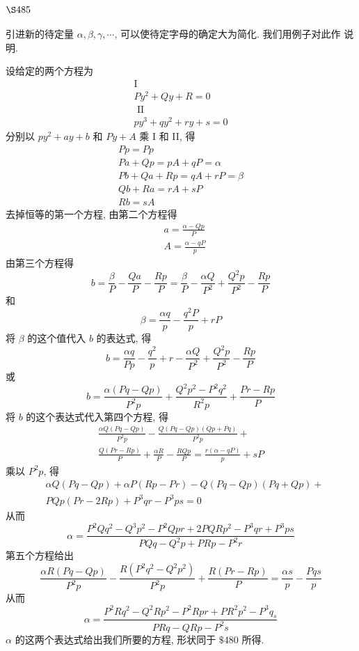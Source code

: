 \section{$\S 485$}

引进新的待定量 $\alpha, \beta, \gamma, \cdots$, 可以使待定字母的确定大为简化. 我们用例子对此作 说明.

设给定的两个方程为
\[
\begin{gathered}
\mathrm{I} \\
P y^{2}+Q y+R=0 \\
\text { II } \\
p y^{3}+q y^{2}+r y+s=0
\end{gathered}
\]
分别以 $p y^{2}+a y+b$ 和 $P y+A$ 乘 I 和 II, 得
\[
\begin{gathered}
P p=P p \\
P a+Q p=p A+q P=\alpha \\
P b+Q a+R p=q A+r P=\beta \\
Q b+R a=r A+s P \\
R b=s A
\end{gathered}
\]
去掉恒等的第一个方程, 由第二个方程得
\[
\begin{aligned}
& a=\frac{\alpha-Q p}{P} \\
& A=\frac{\alpha-q P}{p}
\end{aligned}
\]
由第三个方程得
\[
b=\frac{\beta}{P}-\frac{Q a}{P}-\frac{R p}{P}=\frac{\beta}{P}-\frac{\alpha Q}{P^{2}}+\frac{Q^{2} p}{P^{2}}-\frac{R p}{P}
\]
和
\[
\beta=\frac{\alpha q}{p}-\frac{q^{2} P}{p}+r P
\]
将 $\beta$ 的这个值代入 $b$ 的表达式, 得
\[
b=\frac{\alpha q}{P p}-\frac{q^{2}}{p}+r-\frac{\alpha Q}{P^{2}}+\frac{Q^{2} p}{P^{2}}-\frac{R p}{P}
\]
或
\[
b=\frac{\alpha(P q-Q p)}{P^{2} p}+\frac{Q^{2} p^{2}-P^{2} q^{2}}{R^{2} p}+\frac{P r-R p}{P}
\]
将 $b$ 的这个表达式代入第四个方程, 得
\[
\begin{gathered}
\frac{\alpha Q(P q-Q p)}{P^{2} p}-\frac{Q(P q-Q p)(Q p+P q)}{P^{2} p}+ \\
\frac{Q(P r-R p)}{P}+\frac{\alpha R}{P}-\frac{R Q p}{P}=\frac{r(\alpha-q P)}{p}+s P
\end{gathered}
\]
乘以 $P^{2} p$, 得
\[
\begin{aligned}
& \alpha Q(P q-Q p)+\alpha P(R p-P r)-Q(P q-Q p)(P q+Q p)+ \\
& P Q p(P r-2 R p)+P^{3} q r-P^{3} p s=0
\end{aligned}
\]
从而
\[
\alpha=\frac{P^{2} Q q^{2}-Q^{3} p^{2}-P^{2} Q p r+2 P Q R p^{2}-P^{3} q r+P^{3} p s}{P Q q-Q^{2} p+P R p-P^{2} r}
\]
第五个方程给出
\[
\frac{\alpha R(P q-Q p)}{P^{2} p}-\frac{R\left(P^{2} q^{2}-Q^{2} p^{2}\right)}{P^{2} p}+\frac{R(P r-R p)}{P}=\frac{\alpha s}{p}-\frac{P q s}{p}
\]
从而
\[
\alpha=\frac{P^{2} R q^{2}-Q^{2} R p^{2}-P^{2} R p r+P R^{2} p^{2}-P^{3} q_{s}}{P R q-Q R p-P^{2} s}
\]
$\alpha$ 的这两个表达式给出我们所要的方程, 形状同于 $\$ 480$ 所得. 

